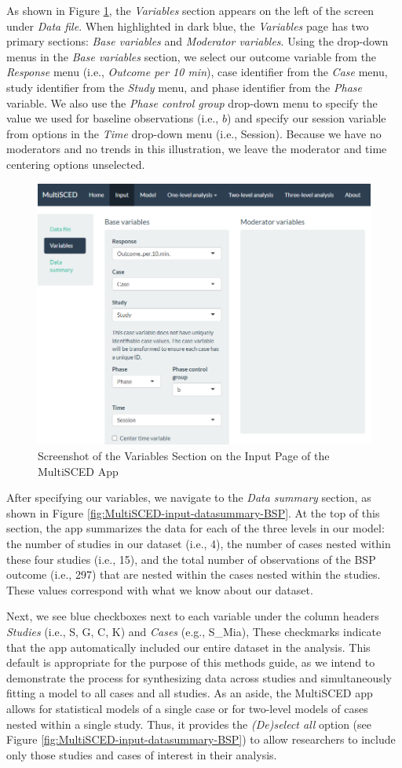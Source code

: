 \documentclass[
]{book}
\begin{document}
As shown in Figure \ref{fig:MultiSCED-input-variables-BSP}, the \emph{Variables} section appears on the left of the screen under \emph{Data file}. When highlighted in dark blue, the \emph{Variables} page has two primary sections: \emph{Base variables} and \emph{Moderator variables}. Using the drop-down menus in the \emph{Base variables} section, we select our outcome variable from the \emph{Response} menu (i.e., \emph{Outcome per 10 min}), case identifier from the \emph{Case} menu, study identifier from the \emph{Study} menu, and phase identifier from the \emph{Phase} variable. We also use the \emph{Phase control group} drop-down menu to specify the value we used for baseline observations (i.e., \(b\)) and specify our session variable from options in the \emph{Time} drop-down menu (i.e., Session). Because we have no moderators and no trends in this illustration, we leave the moderator and time centering options unselected.

\begin{figure}
\includegraphics[width=0.6\linewidth]{images/MultiSCED_input.variables_BSP} \caption{Screenshot of the Variables Section on the Input Page of the MultiSCED App}\label{fig:MultiSCED-input-variables-BSP}
\end{figure}

After specifying our variables, we navigate to the \emph{Data summary} section, as shown in Figure \ref{fig:MultiSCED-input-datasummary-BSP}. At the top of this section, the app summarizes the data for each of the three levels in our model: the number of studies in our dataset (i.e., 4), the number of cases nested within these four studies (i.e., 15), and the total number of observations of the BSP outcome (i.e., 297) that are nested within the cases nested within the studies. These values correspond with what we know about our dataset.

Next, we see blue checkboxes next to each variable under the column headers \emph{Studies} (i.e., S, G, C, K) and \emph{Cases} (e.g., S\_Mia), These checkmarks indicate that the app automatically included our entire dataset in the analysis. This default is appropriate for the purpose of this methods guide, as we intend to demonstrate the process for synthesizing data across studies and simultaneously fitting a model to all cases and all studies. As an aside, the MultiSCED app allows for statistical models of a single case or for two-level models of cases nested within a single study. Thus, it provides the \emph{(De)select all} option (see Figure \ref{fig:MultiSCED-input-datasummary-BSP}) to allow researchers to include only those studies and cases of interest in their analysis.
\end{document}

